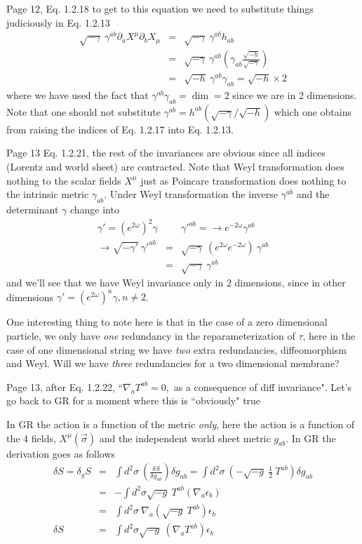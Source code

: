 \documentclass[aps,preprint,preprintnumbers,nofootinbib,showpacs,prd]{revtex4-1}
\newcommand{\nbea}{\begin{eqnarray*}}
\newcommand{\neea}{\end{eqnarray*}}
\begin{document}
Page 12, Eq. 1.2.18 to get to this equation we need to substitute things judiciously in Eq. 1.2.13
%
\nbea
\sqrt{-\gamma}~\gamma^{ab} \partial_a X^\mu \partial_b X_\mu & = & \sqrt{-\gamma}~\gamma^{ab} h_{ab} \\
& = & \sqrt{-\gamma}~\gamma^{ab} \left ( \gamma_{ab} \frac{\sqrt{-h}}{\sqrt{-\gamma}} \right ) \\
& = & \sqrt{-h}~\gamma^{ab} \gamma_{ab} = \sqrt{-h} \times 2
\neea
%
where we have used the fact that $\gamma^{ab} \gamma_{ab} = \dim = 2$ since we are in 2 dimensions. Note that one should not substitute $\gamma^{ab} = h^{ab} (\sqrt{-\gamma}/\sqrt{-h})$ which one obtains from raising the indices of Eq. 1.2.17 into Eq. 1.2.13.

Page 13 Eq. 1.2.21, the rest of the invariances are obvious since all indices (Lorentz and world sheet) are contracted. Note that Weyl transformation does nothing to the scalar fields $X^\mu$ just as Poincare transformation does nothing to the intrinsic metric $\gamma_{ab}$. Under Weyl transformation the inverse $\gamma^{ab}$ and the determinant $\gamma$ change into
%
\nbea
\gamma' = (e^{2\omega})^2 \gamma & ~ & \gamma'^{ab} = \rightarrow e^{-2\omega} \gamma^{ab}\\
\rightarrow \sqrt{-\gamma'}~\gamma'^{ab} & = & \sqrt{-\gamma}~(e^{2\omega}e^{-2\omega})~\gamma^{ab} \\
& = & \sqrt{-\gamma}~\gamma^{ab}
\neea
%
and we'll see that we have Weyl invariance only in 2 dimensions, since in other dimensions $\gamma' = (e^{2\omega})^n \gamma, n \neq 2$. 

One interesting thing to note here is that in the case of a zero dimensional particle, we only have {\it one} redundancy in the reparameterization of $\tau$, here in the case of one dimensional string we have {\it two} extra redundancies, diffeomorphism and Weyl. Will we have {\it three} redundancies for a two dimensional membrane?

Page 13, after Eq. 1.2.22, ``$\nabla_a T^{ab} = 0,$ as a consequence of diff invariance". Let's go back to GR for a moment where this is ``obviously" true

In GR the action is a function of the metric {\it only}, here the action is a function of the 4 fields, $X^\mu(\vec \sigma)$ and the independent world sheet metric $g_{ab}$. In GR the derivation goes as follows
%
\nbea
\delta S = \delta_g S & = & \int d^2\sigma~ \left ( \frac{\delta S}{\delta g_{ab}} \right) \delta g_{ab}  = \int d^2\sigma~ \left ( - \sqrt{-g} ~\frac{1}{2}~ T^{ab} \right ) \delta g_{ab} \\
& = & - \int d^2\sigma \sqrt{-g}~ T^{ab} (\nabla_a \epsilon_b) \\
& = & \int d^2\sigma ~ \nabla_a \left ( \sqrt{-g}~ T^{ab} \right ) \epsilon_b \\
\delta S & = & \int d^2\sigma \sqrt{-g} ~ \left ( \nabla_a T^{ab} \right ) \epsilon_b 
\neea
%
\end{document}
